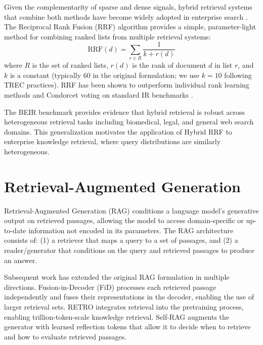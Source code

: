 Given the complementarity of sparse and dense signals, hybrid retrieval systems that combine both methods have become widely adopted in enterprise search \citep{luan2021sparse_dense}. The Reciprocal Rank Fusion (RRF) algorithm \citep{cormack2009rrf} provides a simple, parameter-light method for combining ranked lists from multiple retrieval systems:
\begin{equation}
    \text{RRF}(d) = \sum_{r \in R} \frac{1}{k + r(d)}
    \label{eq:rrf}
\end{equation}
where $R$ is the set of ranked lists, $r(d)$ is the rank of document $d$ in list $r$, and $k$ is a constant (typically 60 in the original formulation; we use $k=10$ following TREC practices). RRF has been shown to outperform individual rank learning methods and Condorcet voting on standard IR benchmarks \citep{cormack2009rrf}.

The BEIR benchmark \citep{thakur2021beir} provides evidence that hybrid retrieval is robust across heterogeneous retrieval tasks including biomedical, legal, and general web search domains. This generalization motivates the application of Hybrid RRF to enterprise knowledge retrieval, where query distributions are similarly heterogeneous.

\section{Retrieval-Augmented Generation}
\label{sec:lit_rag}

Retrieval-Augmented Generation (RAG) \citep{lewis2020rag} conditions a language model's generative output on retrieved passages, allowing the model to access domain-specific or up-to-date information not encoded in its parameters. The RAG architecture consists of: (1) a retriever that maps a query to a set of passages, and (2) a reader/generator that conditions on the query and retrieved passages to produce an answer.

Subsequent work has extended the original RAG formulation in multiple directions. Fusion-in-Decoder (FiD) \citep{izacard2021fid} processes each retrieved passage independently and fuses their representations in the decoder, enabling the use of larger retrieval sets. RETRO \citep{borgeaud2022retro} integrates retrieval into the pretraining process, enabling trillion-token-scale knowledge retrieval. Self-RAG \citep{asai2023selfrag} augments the generator with learned reflection tokens that allow it to decide when to retrieve and how to evaluate retrieved passages.

